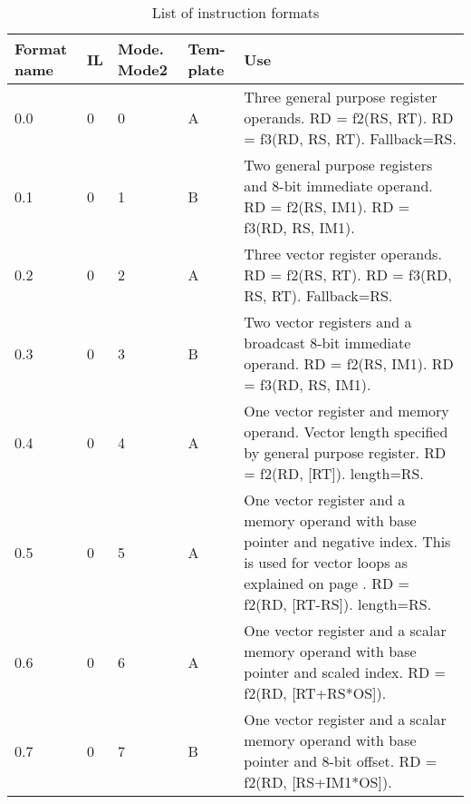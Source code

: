 \documentclass[forwardcom.tex]{subfiles}
\begin{document}
\begin{longtable} {|p{10mm}|p{6mm}|p{9mm}|p{7mm}|p{80mm}|}
\caption{List of instruction formats} \label{table:instructionFormats} \\
\endfirsthead
\endhead
\hline
Format name & IL & Mode. \small Mode2 & Tem-plate & Use \\
\hline
0.0 & 0 & 0 & A & Three general purpose register operands.\newline 
RD = f2(RS, RT). RD = f3(RD, RS, RT).\newline 
Fallback=RS.\\

\hline
0.1 & 0 & 1 & B & Two general purpose registers and 8-bit immediate operand. \newline
RD = f2(RS, IM1). RD = f3(RD, RS, IM1).\\

\hline
0.2 & 0 & 2 & A & Three vector register operands.\newline 
RD = f2(RS, RT). RD = f3(RD, RS, RT).\newline 
Fallback=RS.\\

\hline
0.3 & 0 & 3 & B & Two vector registers and a broadcast 8-bit immediate operand. \newline
RD = f2(RS, IM1). RD = f3(RD, RS, IM1).\\

\hline
0.4 & 0 & 4 & A & One vector register and memory operand. Vector length specified by general purpose register. \newline
RD = f2(RD, [RT]). length=RS.\\

\hline
0.5 & 0 & 5 & A & One vector register and a memory operand with base pointer and negative index.  This is used for vector loops as explained on page \pageref{vectorLoops}. \newline
RD = f2(RD, [RT-RS]). length=RS.\\

\hline
0.6 & 0 & 6 & A & One vector register and a scalar memory operand with base pointer and scaled index. \newline
RD = f2(RD, [RT+RS*OS]).\\

\hline
0.7 & 0 & 7 & B & One vector register and a scalar memory operand with base pointer and 8-bit offset. \newline
RD = f2(RD, [RS+IM1*OS]).\\


\end{longtable}
\end{document}
